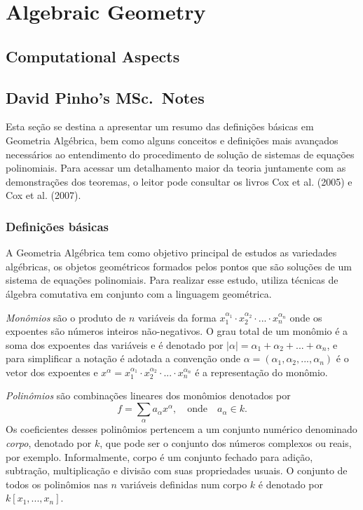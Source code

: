 \mynewpage
\chapter{Algebraic Geometry}\label{sec:algebraic:geometry}



\section{Computational Aspects}

\section{David Pinho's MSc.\ Notes}
Esta seção se destina a apresentar um resumo das definições básicas em Geometria Algébrica, bem como alguns conceitos e definições mais avançados necessários ao entendimento do procedimento de solução de sistemas de equações polinomiais. Para acessar um detalhamento maior da teoria juntamente com as demonstrações dos teoremas, o leitor pode consultar os livros Cox et al. (2005) e Cox et al. (2007).

\subsection{Definições básicas}

A Geometria Algébrica tem como objetivo principal de estudos as variedades algébricas, os objetos geométricos
formados pelos pontos que são soluções de um sistema de equações polinomiais. Para realizar esse estudo, utiliza técnicas de álgebra comutativa em conjunto com a linguagem geométrica.

{\it Monômios} são o produto de $n$ variáveis da forma $x_1^{\alpha_1}\cdot x_2^{\alpha_2} \cdot ... \cdot x_n^{\alpha_n}$ onde os expoentes são números inteiros não-negativos. O grau total de um monômio é a soma dos expoentes das variáveis e é denotado por $|\alpha|=\alpha_1+\alpha_2+...+\alpha_n$, e para simplificar a notação é adotada a convenção onde $\alpha=(\alpha_1,\alpha_2,...,\alpha_n)$ é o vetor dos expoentes e $x^\alpha=x_1^{\alpha_1}\cdot x_2^{\alpha_2} \cdot ... \cdot x_n^{\alpha_n}$ é a representação do monômio.

{\it Polinômios} são combinações lineares dos monômios denotados por
\begin{equation*}
f=\sum_\alpha a_\alpha x^\alpha,\quad\text{onde}\quad a_\alpha\in k.
\end{equation*} 
Os coeficientes desses polinômios pertencem a um conjunto numérico denominado {\it corpo}, denotado por $k$, que pode ser o conjunto dos números complexos ou reais, por exemplo. Informalmente, corpo é um conjunto fechado para adição, subtração, multiplicação e divisão com suas propriedades usuais. O conjunto de todos os polinômios nas $n$ variáveis definidas num corpo $k$ é denotado por $k[x_1,...,x_n]$.

